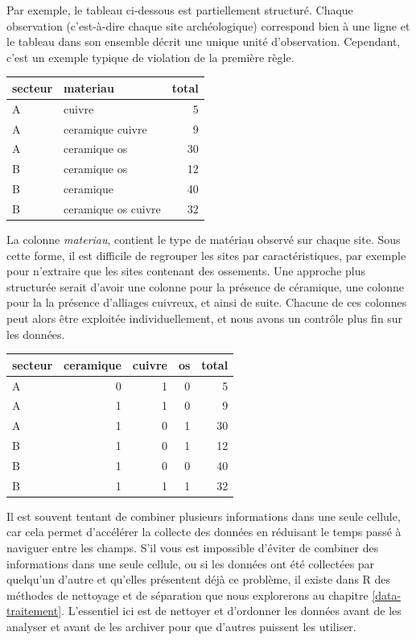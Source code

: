 \documentclass[
  french,
]{scrbook}
\begin{document}
Par exemple, le tableau ci-dessous est partiellement structuré. Chaque observation (c'est-à-dire chaque site archéologique) correspond bien à une ligne et le tableau dans son ensemble décrit une unique unité d'observation. Cependant, c'est un exemple typique de violation de la première règle.

\begin{longtable}[]{@{}llr@{}}
\toprule
secteur & materiau & total \\
\midrule
\endhead
A & cuivre & 5 \\
A & ceramique cuivre & 9 \\
A & ceramique os & 30 \\
B & ceramique os & 12 \\
B & ceramique & 40 \\
B & ceramique os cuivre & 32 \\
\bottomrule
\end{longtable}

La colonne \emph{materiau}, contient le type de matériau observé sur chaque site. Sous cette forme, il est difficile de regrouper les sites par caractéristiques, par exemple pour n'extraire que les sites contenant des ossements. Une approche plus structurée serait d'avoir une colonne pour la présence de céramique, une colonne pour la la présence d'alliages cuivreux, et ainsi de suite. Chacune de ces colonnes peut alors être exploitée individuellement, et nous avons un contrôle plus fin sur les données.

\begin{longtable}[]{@{}lrrrr@{}}
\toprule
secteur & ceramique & cuivre & os & total \\
\midrule
\endhead
A & 0 & 1 & 0 & 5 \\
A & 1 & 1 & 0 & 9 \\
A & 1 & 0 & 1 & 30 \\
B & 1 & 0 & 1 & 12 \\
B & 1 & 0 & 0 & 40 \\
B & 1 & 1 & 1 & 32 \\
\bottomrule
\end{longtable}

Il est souvent tentant de combiner plusieurs informations dans une seule cellule, car cela permet d'accélérer la collecte des données en réduisant le temps passé à naviguer entre les champs. S'il vous est impossible d'éviter de combiner des informations dans une seule cellule, ou si les données ont été collectées par quelqu'un d'autre et qu'elles présentent déjà ce problème, il existe dans R des méthodes de nettoyage et de séparation que nous explorerons au chapitre \ref{data-traitement}. L'essentiel ici est de nettoyer et d'ordonner les données avant de les analyser et avant de les archiver pour que d'autres puissent les utiliser.
\end{document}
